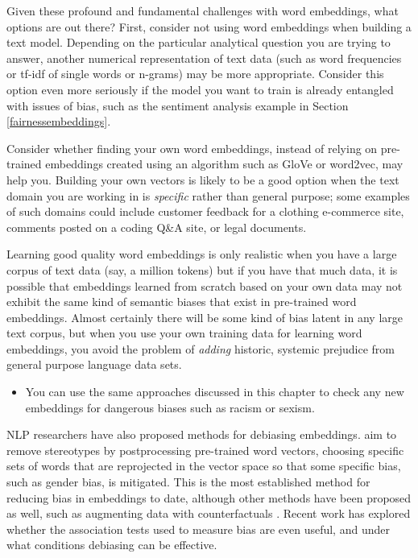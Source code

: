 \documentclass[
]{krantz}
\newenvironment{rmdblock}[1]
  {\begin{shaded*}
  \begin{itemize}[left = -1cm, labelsep = 1cm]
  \renewcommand{\labelitemi}{
    \raisebox{-.7\height}[0pt][0pt]{
      {\setkeys{Gin}{width=3em,keepaspectratio}\texttt{[image: images/\#1]}}
    }
  }
 
  \item
  }
  {
  \end{itemize}
  \end{shaded*}
  }
\newenvironment{rmdnote}
  {\begin{rmdblock}{note}}
  {\end{rmdblock}}
\begin{document}
Given these profound and fundamental challenges with word embeddings, what options are out there? First, consider not using word embeddings when building a text model. Depending on the particular analytical question you are trying to answer, another numerical representation of text data (such as word frequencies or tf-idf of single words or n-grams) may be more appropriate. Consider this option even more seriously if the model you want to train is already entangled with issues of bias, such as the sentiment analysis example in Section \ref{fairnessembeddings}.

Consider whether finding your own word embeddings, instead of relying on pre-trained embeddings created using an algorithm such as GloVe or word2vec, may help you. Building your own vectors is likely to be a good option when the text domain you are working in is \emph{specific} rather than general purpose; some examples of such domains could include customer feedback for a clothing e-commerce site, comments posted on a coding Q\&A site, or legal documents.

Learning good quality word embeddings is only realistic when you have a large corpus of text data (say, a million tokens) but if you have that much data, it is possible that embeddings learned from scratch based on your own data may not exhibit the same kind of semantic biases that exist in pre-trained word embeddings. Almost certainly there will be some kind of bias latent in any large text corpus, but when you use your own training data for learning word embeddings, you avoid the problem of \emph{adding} historic, systemic prejudice from general purpose language data sets.

\begin{rmdnote}
You can use the same approaches discussed in this chapter to check any
new embeddings for dangerous biases such as racism or sexism.
\end{rmdnote}


NLP researchers have also proposed methods for debiasing embeddings. \citet{Bolukbasi2016} aim to remove stereotypes by postprocessing pre-trained word vectors, choosing specific sets of words that are reprojected in the vector space so that some specific bias, such as gender bias, is mitigated. This is the most established method for reducing bias in embeddings to date, although other methods have been proposed as well, such as augmenting data with counterfactuals \citep{Lu2018}. Recent work \citep{Ethayarajh2019} has explored whether the association tests used to measure bias are even useful, and under what conditions debiasing can be effective.
\end{document}
